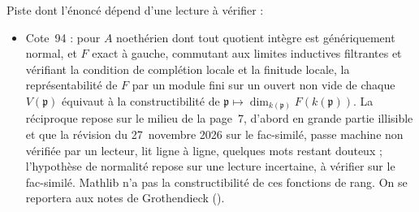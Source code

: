 \noindent Piste dont l'énoncé dépend d'une lecture à vérifier :
\begin{itemize}\small\setlength{\itemsep}{0pt}
\item Cote~94 : pour $A$ noethérien dont tout quotient intègre est génériquement normal, et $F$ exact à gauche, commutant aux limites inductives filtrantes et vérifiant la condition de complétion locale et la finitude locale, la représentabilité de $F$ par un module fini sur un ouvert non vide de chaque $V(\mathfrak p)$ équivaut à la constructibilité de $\mathfrak p \mapsto \dim_{k(\mathfrak p)} F(k(\mathfrak p))$. La réciproque repose sur le milieu de la page~7, d'abord en grande partie illisible et que la révision du 27~novembre 2026 sur le fac-similé, passe machine non vérifiée par un lecteur, lit ligne à ligne, quelques mots restant douteux ; l'hypothèse de normalité repose sur une lecture incertaine, à vérifier sur le fac-similé. Mathlib n'a pas la constructibilité de ces fonctions de rang. On se reportera aux notes de Grothendieck ().
\end{itemize}

